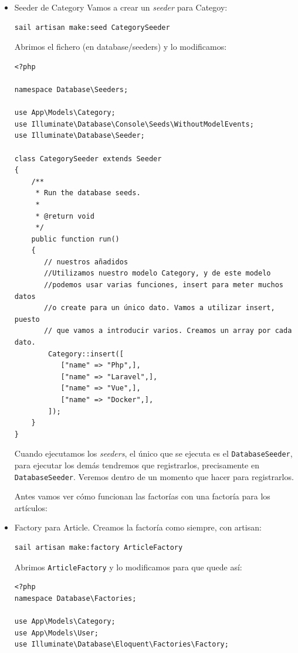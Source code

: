 \documentclass[11pt]{article}
\begin{document}
\begin{itemize}
\item Seeder de Category
\label{sec:orgddc0f67}
Vamos a crear un \emph{seeder} para Categoy:
\begin{verbatim}
sail artisan make:seed CategorySeeder
\end{verbatim}

Abrimos el fichero (en database/seeders) y lo modificamos:
\begin{verbatim}
<?php

namespace Database\Seeders;

use App\Models\Category;
use Illuminate\Database\Console\Seeds\WithoutModelEvents;
use Illuminate\Database\Seeder;

class CategorySeeder extends Seeder
{
    /**
     * Run the database seeds.
     *
     * @return void
     */
    public function run()
    {
       // nuestros añadidos
       //Utilizamos nuestro modelo Category, y de este modelo
       //podemos usar varias funciones, insert para meter muchos datos
       //o create para un único dato. Vamos a utilizar insert, puesto
       // que vamos a introducir varios. Creamos un array por cada dato.
        Category::insert([
           ["name" => "Php",],
           ["name" => "Laravel",],
           ["name" => "Vue",],
           ["name" => "Docker",],
        ]);
    }
}
\end{verbatim}

Cuando ejecutamos los \emph{seeders}, el único que se ejecuta es el
\texttt{DatabaseSeeder}, para ejecutar los demás tendremos que registrarlos,
precisamente en \texttt{DatabaseSeeder}. Veremos dentro de un momento que
hacer para registrarlos.

Antes vamos ver cómo funcionan las factorías con una factoría para los
artículos:
\item Factory para Article.
\label{sec:org11dba67}
Creamos la factoría como siempre, con artisan:

\begin{verbatim}
sail artisan make:factory ArticleFactory
\end{verbatim}

Abrimos \texttt{ArticleFactory} y lo modificamos para que quede así:
\begin{verbatim}
<?php
namespace Database\Factories;

use App\Models\Category;
use App\Models\User;
use Illuminate\Database\Eloquent\Factories\Factory;


\end{verbatim}
\end{itemize}
\end{document}
